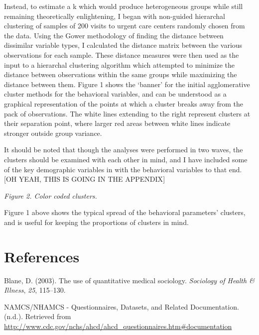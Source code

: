 \documentclass[12pt,twoside]{reedthesis}
\begin{document}
  Instead, to estimate a k which would produce heterogeneous groups while
  still remaining theoretically enlightening, I began with non-guided
  hierarchal clustering of samples of 200 visits to urgent care centers
  randomly chosen from the data. Using the Gower methodology of finding
  the distance between dissimilar variable types, I calculated the
  distance matrix between the various observations for each sample. These
  distance measures were then used as the input to a hierarchal clustering
  algorithm which attempted to minimize the distance between observations
  within the same groups while maximizing the distance between them.
  Figure 1 shows the `banner' for the initial agglomerative cluster
  methods for the behavioral variables, and can be understood as a
  graphical representation of the points at which a cluster breaks away
  from the pack of observations. The white lines extending to the right
  represent clusters at their separation point, where larger red areas
  between white lines indicate stronger outside group variance.
  
  It should be noted that though the analyses were performed in two waves,
  the clusters should be examined with each other in mind, and I have
  included some of the key demographic variables in with the behavioral
  variables to that end. {[}OH YEAH, THIS IS GOING IN THE APPENDIX{]}
  
  \emph{Figure 2. Color coded clusters.}
  
  Figure 1 above shows the typical spread of the behavioral parameters'
  clusters, and is useful for keeping the proportions of clusters in mind.
  
  \backmatter
  
  \chapter{References}\label{references}
  
  \noindent
  
  \setlength{\parindent}{-0.20in} \setlength{\leftskip}{0.20in}
  \setlength{\parskip}{8pt}
  
  \hypertarget{refs}{}
  \hypertarget{ref-blaneux5fuseux5f2003}{}
  Blane, D. (2003). The use of quantitative medical sociology.
  \emph{Sociology of Health \& Illness}, \emph{25}, 115--130.
  
  \hypertarget{ref-namcs}{}
  NAMCS/NHAMCS - Questionnaires, Datasets, and Related Documentation.
  (n.d.). Retrieved from
  \url{http://www.cdc.gov/nchs/ahcd/ahcd_questionnaires.htm\#documentation}


\end{document}
